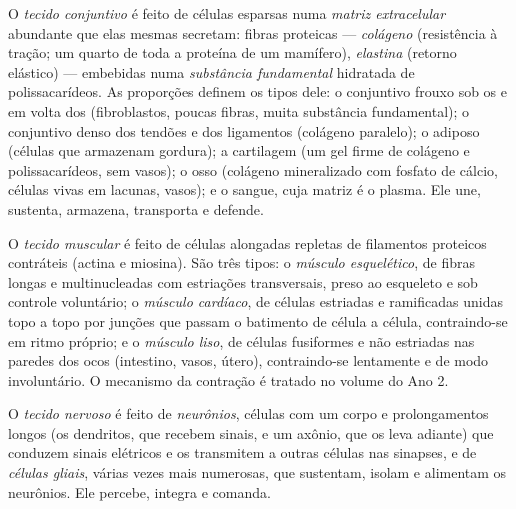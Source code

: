 \begin{definition}\label{def:b1:body-plans-tissues:connective}
O \emph{tecido conjuntivo} é feito de células
esparsas numa \emph{matriz extracelular}
abundante que elas mesmas secretam: fibras proteicas ---
\emph{colágeno} (resistência à tração; um quarto de toda
a proteína de um mamífero), \emph{elastina} (retorno
elástico) --- embebidas numa \emph{substância fundamental} hidratada de
polissacarídeos. As proporções definem os tipos dele: o 
conjuntivo frouxo sob os  e em volta dos  (fibroblastos,
poucas fibras, muita substância fundamental); o  conjuntivo denso
dos tendões e dos ligamentos (colágeno paralelo); o  adiposo
(células que armazenam gordura); a cartilagem (um gel firme de colágeno
e polissacarídeos, sem vasos); o osso (colágeno mineralizado com fosfato
de cálcio, células vivas em lacunas, vasos); e o sangue, cuja matriz é o
plasma. Ele une, sustenta, armazena, transporta e defende.
\end{definition}

\begin{definition}\label{def:b1:body-plans-tissues:muscle}
O \emph{tecido muscular} é feito de células
alongadas repletas de filamentos proteicos contráteis (actina e
miosina). São três tipos: o \emph{músculo esquelético}, de fibras longas
e multinucleadas com estriações transversais, preso ao esqueleto e sob
controle voluntário; o \emph{músculo cardíaco}, de células estriadas e
ramificadas unidas topo a topo por junções que passam o batimento de
célula a célula, contraindo-se em ritmo próprio; e o
\emph{músculo liso}, de células fusiformes e não estriadas nas paredes
dos  ocos (intestino, vasos, útero), contraindo-se lentamente e
de modo involuntário. O mecanismo da contração é tratado no volume do
Ano 2.
\end{definition}

\begin{definition}\label{def:b1:body-plans-tissues:nervous}
O \emph{tecido nervoso} é feito de
\emph{neurônios}, células com um corpo e prolongamentos
longos (os dendritos, que recebem sinais, e um axônio, que os leva
adiante) que conduzem sinais elétricos e os transmitem a outras células
nas sinapses, e de \emph{células gliais}, várias
vezes mais numerosas, que sustentam, isolam e alimentam os neurônios.
Ele percebe, integra e comanda.
\end{definition}

